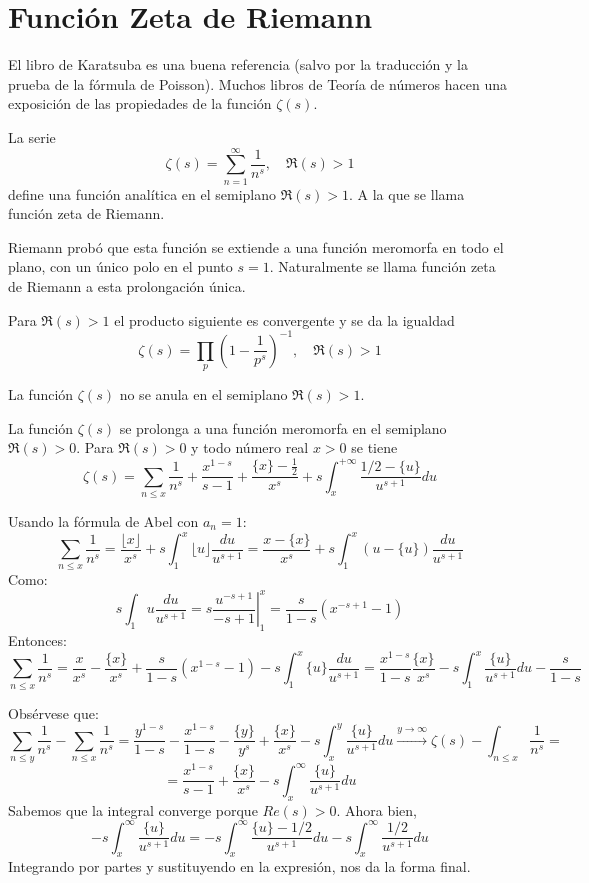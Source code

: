 \documentclass[TAN.tex]{subfiles}
\begin{document}
\section{Función Zeta de Riemann}
El libro de Karatsuba es una buena referencia (salvo por la traducción y la prueba de la fórmula de Poisson). Muchos libros de Teoría de números hacen una exposición de las propiedades de la función $ζ(s)$.
\begin{defi}
La serie
\[ ζ(s) = \sum_{n=1}^{∞} \frac{1}{n^s}, \quad \Re(s) > 1 \]
define una función analítica en el semiplano $\Re(s) > 1$. A la que se llama función zeta de Riemann.
\end{defi}
Riemann probó que esta función se extiende a una función meromorfa en todo el plano, con un único polo en el punto $s = 1$. Naturalmente se llama función zeta de Riemann a esta prolongación única.
\begin{teorema}
Para $\Re(s)>1$ el producto siguiente es convergente y se da la igualdad
\[ ζ(s) = \prod_p \left(1-\frac{1}{p^s}\right)^{-1}, \quad \Re(s) > 1 \]
\end{teorema}
\begin{coro}
La función $ζ(s)$ no se anula en el semiplano $\Re(s)>1$.
\end{coro}
\begin{teorema}
La función $ζ(s)$ se prolonga a una función meromorfa en el semiplano $\Re(s) > 0$. Para $\Re(s) > 0$ y todo número real $x > 0$ se tiene
\[ ζ(s) = \sum_{n ≤ x} \frac{1}{n^s} + \frac{x^{1-s}}{s-1} + \frac{\{x\}-\frac{1}{2}}{x^s} + s \int_x^{+∞} \frac{1/2-\{u\}}{u^{s+1}} du \]
\end{teorema}
\begin{dem}
Usando la fórmula de Abel con $a_n=1$:
\[ \sum_{n≤x} \frac{1}{n^s} = \frac{\lfloor x \rfloor}{x^s} + s\int_1^x \lfloor u \rfloor\frac{du}{u^{s+1}} = \frac{x-\{x\}}{x^s} + s \int_1^x (u-\{u\}) \frac{du}{u^{s+1}} \]
Como:
\[ s\int_1 u \frac{du}{u^{s+1}} = s \left.\frac{u^{-s+1}}{-s+1}\right|_1^x = \frac{s}{1-s}(x^{-s+1}-1) \]
Entonces:
\[ \sum_{n≤x} \frac{1}{n^s} = \frac{x}{x^s}-\frac{\{x\}}{x^s} + \frac{s}{1-s}(x^{1-s}-1)- s\int_1^x \{u\} \frac{du}{u^{s+1}} = \frac{x^{1-s}}{1-s}  \frac{\{x\}}{x^s} - s \int_1^x \frac{\{u\}}{u^{s+1}}du - \frac{s}{1-s} \]

Obsérvese que:
\[ \sum_{n≤y}\frac{1}{n^s} - \sum_{n≤x} \frac{1}{n^s} = \frac{y^{1-s}}{1-s} -\frac{x^{1-s}}{1-s}- \frac{\{y\}}{y^s} + \frac{\{x\}}{x^s} -s\int_x^y \frac{\{u\}}{u^{s+1}} du \xrightarrow{y \to ∞}ζ(s)-\int_{n≤x} \frac{1}{n^s} = \]
\[ = \frac{x^{1-s}}{s-1}+ \frac{\{x\}}{x^s} -s\int_x^{∞} \frac{\{u\}}{u^{s+1}}du \]
Sabemos que la integral converge porque $Re(s)>0$. Ahora bien,
\[ -s\int_x^∞ \frac{\{u\}}{u^{s+1}} du = -s\int_x^{∞} \frac{\{u\}-1/2}{u^{s+1}} du - s\int_x^{∞} \frac{1/2}{u^{s+1}} du \]
Integrando por partes y sustituyendo en la expresión, nos da la forma final.
\end{dem}
\end{document}
